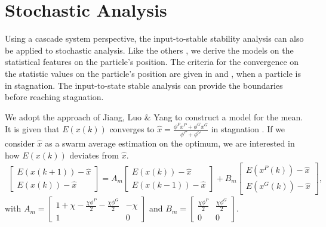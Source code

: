 \section{Stochastic Analysis}
\label{sec:sto_anly}

Using a cascade system perspective, the input-to-stable stability analysis can also be applied to stochastic analysis.
Like the others \cite{Jiang20078,Poli:2008:DSS:1384929.1384944}, we derive the models on the statistical features on the particle's position.
The criteria for the convergence on the statistic values on the particle's position are given in \cite{Jiang20078} and \cite{Poli:2008:DSS:1384929.1384944}, when a particle is in stagnation.
The input-to-state stable analysis can provide the boundaries before reaching stagnation.


We adopt the approach of Jiang, Luo \& Yang to construct a model for the mean.
It is given that $ E( x(k) ) $ converges to $ \hat{x} = \frac{\phi^{P} x^{P} + \phi^{G} x^{G} }{ \phi^{P} + \phi^{G} } $ in stagnation \cite{Jiang20078}.
If we consider $ \hat{x} $ as a swarm average estimation on the optimum, we are interested in how $ E( x(k) ) $ deviates from $ \hat{x} $.
\begin{equation}
\label{eq:pso1_alg_mean_linalg:final}
\begin{aligned}
\begin{bmatrix}
E( x(k+1) ) - \hat{x} \\
E( x(k) ) - \hat{x}
\end{bmatrix}
= 
A_{m}
\begin{bmatrix}
E( x(k) ) - \hat{x} \\
E( x(k-1) ) - \hat{x}
\end{bmatrix}
+
B_{m}
\begin{bmatrix}
E( x^{P}(k) ) - \hat{x}\\
E( x^{G}(k) ) - \hat{x}
\end{bmatrix},
\end{aligned}
\end{equation}
with $ A_{m} = \begin{bmatrix}
1 + \chi - \frac{ \chi \phi^{P} }{2} - \frac{ \chi \phi^{G} }{2} & -\chi \\
1 & 0
\end{bmatrix} $
and $ B_{m} = \begin{bmatrix}
\frac{ \chi \phi^{P} }{2} & \frac{ \chi \phi^{G} }{2} \\
0 & 0
\end{bmatrix} $.

